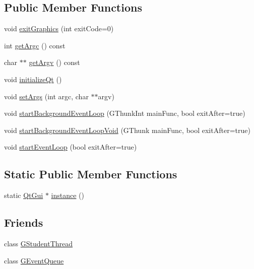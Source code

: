 \subsection*{Public Member Functions}
\begin{DoxyCompactItemize}
\item 
void \mbox{\hyperlink{classQtGui_ac202b7b117db218b20100ff50ac06613}{exit\+Graphics}} (int exit\+Code=0)
\item 
int \mbox{\hyperlink{classQtGui_ac305f93c30c0ae9ff4266c83ba46a168}{get\+Argc}} () const
\item 
char $\ast$$\ast$ \mbox{\hyperlink{classQtGui_a46e4245c4928dc68df6adb79042ca3d5}{get\+Argv}} () const
\item 
void \mbox{\hyperlink{classQtGui_adb686b20d7ffc27cb775f329d62ec04a}{initialize\+Qt}} ()
\item 
void \mbox{\hyperlink{classQtGui_af1a059b29256886524d1b7a1db0323d8}{set\+Args}} (int argc, char $\ast$$\ast$argv)
\item 
void \mbox{\hyperlink{classQtGui_a600f1cfdb1eaad8513a46c908e5e0343}{start\+Background\+Event\+Loop}} (G\+Thunk\+Int main\+Func, bool exit\+After=true)
\item 
void \mbox{\hyperlink{classQtGui_ac216b7bc5811edcf581c1a054a502410}{start\+Background\+Event\+Loop\+Void}} (G\+Thunk main\+Func, bool exit\+After=true)
\item 
void \mbox{\hyperlink{classQtGui_ab1d3fce359afdedda7d7f661727326c1}{start\+Event\+Loop}} (bool exit\+After=true)
\end{DoxyCompactItemize}
\subsection*{Static Public Member Functions}
\begin{DoxyCompactItemize}
\item 
static \mbox{\hyperlink{classQtGui}{Qt\+Gui}} $\ast$ \mbox{\hyperlink{classQtGui_a493a8e6df5ef99234afa0f9d5e75bb8f}{instance}} ()
\end{DoxyCompactItemize}
\subsection*{Friends}
\begin{DoxyCompactItemize}
\item 
class \mbox{\hyperlink{classQtGui_a463bf796138059b610e9a24b6e0d0352}{G\+Student\+Thread}}
\item 
class \mbox{\hyperlink{classQtGui_afb1f0c67242cfba4a57464caedea6908}{G\+Event\+Queue}}
\end{DoxyCompactItemize}


